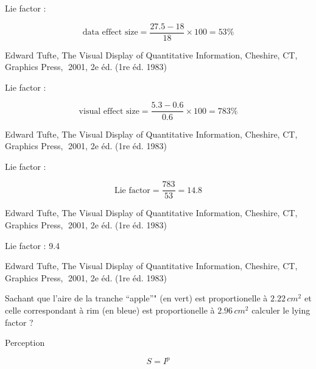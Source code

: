 \documentclass[ignorenonframetext,]{beamer}
\begin{document}
\begin{frame}{}
\protect\hypertarget{section-16}{}

Lie factor :

\[\textrm{data effect size} = \frac{27.5 - 18}{18} \times 100 = 53 \%\]

Edward Tufte, The Visual Display of Quantitative Information, Cheshire,
CT, Graphics Press, 2001, 2e éd. (1re éd. 1983)

\end{frame}

\begin{frame}{}
\protect\hypertarget{section-17}{}

Lie factor :

\[\textrm{visual effect size} = \frac{5.3 -0.6}{0.6} \times 100 = 783 \%\]

Edward Tufte, The Visual Display of Quantitative Information, Cheshire,
CT, Graphics Press, 2001, 2e éd. (1re éd. 1983)

\end{frame}

\begin{frame}{}
\protect\hypertarget{section-18}{}

Lie factor :

\[\textrm{Lie factor} = \frac{783}{53} = 14.8\]

Edward Tufte, The Visual Display of Quantitative Information, Cheshire,
CT, Graphics Press, 2001, 2e éd. (1re éd. 1983)

\end{frame}

\begin{frame}{}
\protect\hypertarget{section-19}{}

Lie factor : 9.4

Edward Tufte, The Visual Display of Quantitative Information, Cheshire,
CT, Graphics Press, 2001, 2e éd. (1re éd. 1983)

\end{frame}

\begin{frame}{}
\protect\hypertarget{section-20}{}

Sachant que l'aire de la tranche ``apple''" (en vert) est proportionelle
à \(2.22\,cm^2\) et celle correspondant à rim (en bleue) est
proportionelle à \(2.96\,cm^2\) calculer le lying factor ?

\end{frame}

\begin{frame}{Perception}
\protect\hypertarget{perception}{}

\[S = I^p\]

\end{frame}
\end{document}
